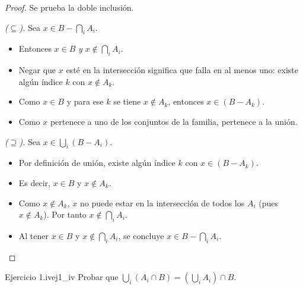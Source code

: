 \documentclass[11pt, a4paper]{article}
\begin{document}
\begin{proof}
Se prueba la doble inclusión.

\textit{($\subseteq$).} Sea $x \in B - \bigcap_{i} A_i$.
\begin{itemize}
    \item Entonces $x \in B$ \emph{y} $x \notin \bigcap_{i} A_i$.
    \item Negar que $x$ esté en la intersección significa que falla en al menos uno: existe algún
    índice $k$ con $x \notin A_k$.
    \item Como $x \in B$ y para ese $k$ se tiene $x \notin A_k$, entonces $x \in (B - A_k)$.
    \item Como $x$ pertenece a uno de los conjuntos de la familia, pertenece a la unión.
\end{itemize}

\textit{($\supseteq$).} Sea $x \in \bigcup_{i} (B - A_i)$.
\begin{itemize}
    \item Por definición de unión, existe algún índice $k$ con $x \in (B - A_k)$.
    \item Es decir, $x \in B$ y $x \notin A_k$.
    \item Como $x \notin A_k$, $x$ no puede estar en la intersección de todos los $A_i$ (pues $x \notin A_k$). Por tanto $x \notin \bigcap_{i} A_i$.
    \item Al tener $x \in B$ y $x \notin \bigcap_{i} A_i$, se concluye $x \in B - \bigcap_{i} A_i$.
\end{itemize}
\end{proof}

\begin{proposicion}{Ejercicio 1.iv}{ej1_iv}
Probar que $\bigcup_{i} (A_i \cap B) = (\bigcup_{i} A_i) \cap B$.
\end{proposicion}
\end{document}
